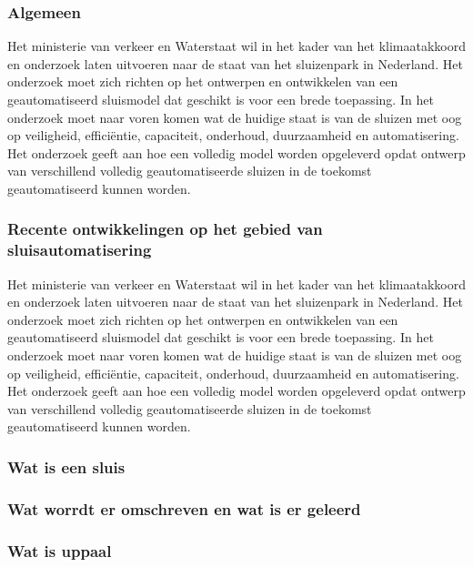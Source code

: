  
 

\subsubsection{Algemeen}

Het ministerie van verkeer en Waterstaat wil in het kader van het klimaatakkoord en onderzoek laten uitvoeren naar de staat van het sluizenpark in Nederland. Het onderzoek moet zich richten op het ontwerpen en ontwikkelen van een geautomatiseerd sluismodel dat geschikt is voor een brede toepassing. In het onderzoek moet naar voren komen wat de huidige staat is van de sluizen met oog op veiligheid, efficiëntie, capaciteit, onderhoud, duurzaamheid en automatisering. Het onderzoek geeft aan hoe een volledig model worden opgeleverd opdat ontwerp van verschillend volledig geautomatiseerde sluizen in de toekomst geautomatiseerd kunnen worden.  

\subsubsection{Recente ontwikkelingen op het gebied van sluisautomatisering}

Het ministerie van verkeer en Waterstaat wil in het kader van het klimaatakkoord en onderzoek laten uitvoeren naar de staat van het sluizenpark in Nederland. Het onderzoek moet zich richten op het ontwerpen en ontwikkelen van een geautomatiseerd sluismodel dat geschikt is voor een brede toepassing. In het onderzoek moet naar voren komen wat de huidige staat is van de sluizen met oog op veiligheid, efficiëntie, capaciteit, onderhoud, duurzaamheid en automatisering. Het onderzoek geeft aan hoe een volledig model worden opgeleverd opdat ontwerp van verschillend volledig geautomatiseerde sluizen in de toekomst geautomatiseerd kunnen worden.  
\subsubsection{Wat is een sluis}

\subsubsection{Wat worrdt er omschreven en wat is er geleerd}

\subsubsection{Wat is uppaal}


